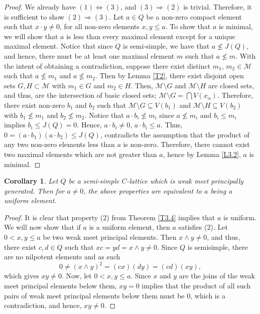 \documentclass[11pt,english]{amsart}
\newtheorem{corollary}[theorem]{Corollary}
\theoremstyle{definition}
\numberwithin{equation}{section}
\theoremstyle{remark}
\def\leq{\leqslant}
\begin{document}
	\begin{proof}
		We already have $(1)\Leftrightarrow(3)$, and $(3)\Rightarrow(2)$ is trivial. Therefore, it is sufficient to show $(2)\Rightarrow(3)$. Let $a\in Q$ be a non-zero compact element such that $x\cdot y \neq 0$, for all non-zero elements $x,y\leq a$. To show that $a$ is minimal, we will show that $a$ is less than every maximal element except for a unique maximal element. Notice that since $Q$ is semi-simple, we have that $a\nleq J(Q)$, and hence, there must be at least one maximal element $m$ such that $a\nleq m$. With the intent of obtaining a contradiction, suppose there exist distinct $m_1$, $m_2\in \mathcal{M}$ such that $a\nleq m_1$ and $a\nleq m_2$. Then by Lemma \ref{T2}, there exist disjoint open sets $G,H\subset\mathcal{M}$ with $m_1\in G$ and $m_2\in H$. Then,  $\mathcal{M}\setminus G$ and $\mathcal{M}\setminus H$ are closed sets, and thus, are the intersection of basic closed sets; $\mathcal{M}\setminus G =\bigcap V(x_\alpha) $. Therefore, there exist  non-zero $b_1$ and $b_2$ such that $\mathcal{M}\setminus G \subseteq V(b_1)$ and $\mathcal{M}\setminus H\subseteq V(b_2)$ with $b_1\nleq m_1$ and $b_2\nleq m_2$. Notice that $a\cdot b_i\nleq m_i$ since $a\nleq m_i$ and $b_i\leq m_i$ implies $b_i\leq J(Q)=0$. Hence, $a\cdot b_i\neq 0$, $a\cdot b_i\leq a$. Thus, $0=(a\cdot b_1)(a\cdot b_2)\leq J(Q)$, contradicts the assumption that the product of any two non-zero elements less than $a$ is non-zero. Therefore, there cannot exist two maximal elements which are not greater than $a$, hence by Lemma \ref{L3.2}, $a$ is minimal.
	\end{proof}
	
	\begin{corollary}\label{C3.6}
		Let $Q$ be a semi-simple $C$-lattice which is weak meet principally generated. Then for $a\neq 0$, the above properties are equivalent to $a$ being a uniform element.
	\end{corollary}
	
	\begin{proof}
		It is clear that property (2) from Theorem \ref{T3.4} implies that $a$ is uniform. We will now show that if $a$ is a uniform element, then $a$ satisfies (2). Let $0<x,y\leq a$ be two weak meet principal elements. Then $x\wedge y\neq 0$, and thus, there exist $c,d \in Q$ such that $xc=yd=x\wedge y\neq 0$. Since $Q$ is semisimple,  there are no nilpotent elements and as such \[0\neq(x\wedge y)^2=(cx)(dy)=(cd)(xy),\] which gives $xy\neq0$. Now, let $0<x,y\leq a$. Since $x$ and $y$ are the joins of the weak meet principal elements below them, $xy=0$ implies that the product of all such pairs of weak meet principal elements below them must be $0$, which is a contradiction, and hence, $xy\neq 0$. 
	\end{proof}
	
\end{document}
